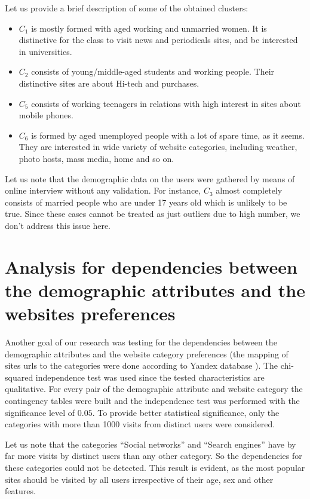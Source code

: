 \documentclass[runningheads,a4paper]{llncs}
\begin{document}
Let us provide a brief description of some of the obtained clusters:
\begin{itemize}
	\item $C_1$ is mostly formed with aged working and unmarried women. It is distinctive for the class to visit news and periodicals sites, and be interested in universities.
    
    \item $C_2$ consists of young/middle-aged students and working people. Their distinctive sites are about Hi-tech and purchases.

	\item $C_5$ consists of working teenagers in relations with high interest in sites about mobile phones.
    
	\item $C_6$ is formed by aged unemployed people with a lot of spare time, as it seems. They are interested in wide variety of website categories, including weather, photo hosts, mass media, home and so on.
\end{itemize}

Let us note that the demographic data on the users were gathered by means of online interview without any validation. For instance, $C_3$ almost completely consists of married people who are under 17 years old which is unlikely to be true. Since these cases cannot be treated as just outliers due to high number, we don't address this issue here.


\section{Analysis for dependencies between the demographic attributes and the websites preferences}



Another goal of our research was testing for the dependencies between the demographic attributes and the website category preferences (the mapping of sites urls to the categories were done according to Yandex database \cite{yandex}). The chi-squared independence test was used since the tested characteristics are qualitative. For every pair of the demographic attribute and website category the contingency tables were built and the independence test was performed with the significance level of $0.05$. To provide better statistical significance, only the categories with more than 1000 visits from distinct users were considered.

Let us note that the categories ``Social networks'' and ``Search engines'' have by far more visits by distinct users than any other category. So the dependencies for these categories could not be detected. This result is evident, as the most popular sites should be visited by all users irrespective of their age, sex and other features. 
\end{document}
